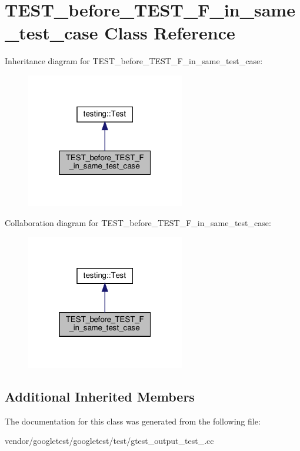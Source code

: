 \hypertarget{class_t_e_s_t__before___t_e_s_t___f__in__same__test__case}{}\section{T\+E\+S\+T\+\_\+before\+\_\+\+T\+E\+S\+T\+\_\+\+F\+\_\+in\+\_\+same\+\_\+test\+\_\+case Class Reference}
\label{class_t_e_s_t__before___t_e_s_t___f__in__same__test__case}


Inheritance diagram for T\+E\+S\+T\+\_\+before\+\_\+\+T\+E\+S\+T\+\_\+\+F\+\_\+in\+\_\+same\+\_\+test\+\_\+case\+:
\nopagebreak
\begin{figure}[H]
\begin{center}
\leavevmode
\includegraphics[width=196pt]{class_t_e_s_t__before___t_e_s_t___f__in__same__test__case__inherit__graph}
\end{center}
\end{figure}


Collaboration diagram for T\+E\+S\+T\+\_\+before\+\_\+\+T\+E\+S\+T\+\_\+\+F\+\_\+in\+\_\+same\+\_\+test\+\_\+case\+:
\nopagebreak
\begin{figure}[H]
\begin{center}
\leavevmode
\includegraphics[width=196pt]{class_t_e_s_t__before___t_e_s_t___f__in__same__test__case__coll__graph}
\end{center}
\end{figure}
\subsection*{Additional Inherited Members}


The documentation for this class was generated from the following file\+:\begin{DoxyCompactItemize}
\item 
vendor/googletest/googletest/test/gtest\+\_\+output\+\_\+test\+\_\+.\+cc\end{DoxyCompactItemize}
